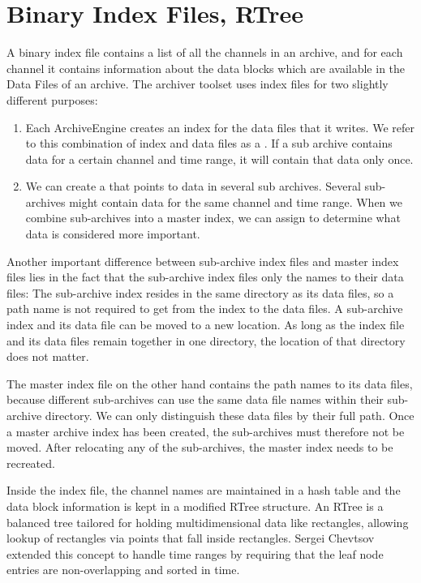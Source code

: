 \section{Binary Index Files, RTree}
A binary index file contains a list of all the channels in an archive, and
for each channel it contains information about the data blocks which
are available in the Data Files of an archive.
The archiver toolset uses index files for two slightly different
purposes:
\begin{enumerate}
\item Each ArchiveEngine creates an index for the data files
      that it writes.
      We refer to this combination of index and data files
      as a .
      If a sub archive contains data for a certain channel and time
      range, it will contain that data only once.
\item We can create a  that points to data
      in several sub archives.
      Several sub-archives might contain data for the same channel
      and time range. When we combine sub-archives into a master
      index, we can assign  to
      determine what data is considered more important.
\end{enumerate}

\noindent Another important difference between sub-archive index files
and master index files lies in the fact that the sub-archive index
files only the names to their data files: The sub-archive index
resides in the same directory as its data files, so a path name is not
required to get from the index to the data files.
A sub-archive index and its data file can be moved to a new
location. As long as the index file and its data files remain
together in one directory, the location of that directory does not matter.

The master index file on the other hand contains the path names to its
data files, because different sub-archives can use the same data file
names within their sub-archive directory. We can only distinguish these
data files by their full path.  Once a master archive index has been
created, the sub-archives must therefore not be moved. After
relocating any of the sub-archives, the master index needs to be recreated.

Inside the index file, the channel names are maintained in a hash
table and the data block information is kept in a modified RTree
structure.  An RTree \cite{guttman84} is a balanced tree tailored for
holding multidimensional data like rectangles, allowing lookup of
rectangles via points that fall inside rectangles.  Sergei Chevtsov
extended this concept to handle time ranges by requiring that the leaf
node entries are non-overlapping and sorted in time.

